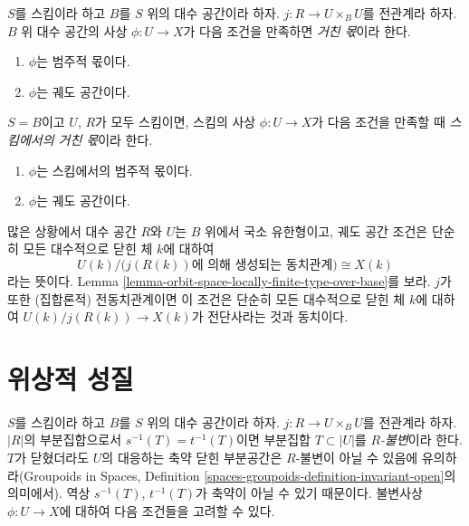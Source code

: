 \begin{definition}
\label{definition-coarse}
$S$를 스킴이라 하고 $B$를 $S$ 위의 대수 공간이라 하자.
$j : R \to U \times_B U$를 전관계라 하자.
$B$ 위 대수 공간의 사상 $\phi : U \to X$가 다음 조건을
만족하면 {\it 거친 몫}이라 한다.
\begin{enumerate}
\item $\phi$는 범주적 몫이다.
\item $\phi$는 궤도 공간이다.
\end{enumerate}
$S = B$이고 $U$, $R$가 모두 스킴이면, 스킴의 사상
$\phi : U \to X$가 다음 조건을 만족할 때
{\it 스킴에서의 거친 몫}이라 한다.
\begin{enumerate}
\item $\phi$는 스킴에서의 범주적 몫이다.
\item $\phi$는 궤도 공간이다.
\end{enumerate}
\end{definition}

\noindent
많은 상황에서 대수 공간 $R$와 $U$는 $B$ 위에서 국소 유한형이고,
궤도 공간 조건은 단순히 모든 대수적으로 닫힌 체 $k$에 대하여
$$
U(k)/\big(j(R(k))\text{에 의해 생성되는 동치관계}\big)
\cong
X(k)
$$
라는 뜻이다. Lemma
\ref{lemma-orbit-space-locally-finite-type-over-base}를 보라.
$j$가 또한 (집합론적) 전동치관계이면 이 조건은 단순히 모든
대수적으로 닫힌 체 $k$에 대하여
$U(k)/j(R(k)) \to X(k)$가 전단사라는 것과 동치이다.








\section{위상적 성질}
\label{section-topological}

\noindent
$S$를 스킴이라 하고 $B$를 $S$ 위의 대수 공간이라 하자.
$j : R \to U \times_B U$를 전관계라 하자.
$|R|$의 부분집합으로서 $s^{-1}(T) = t^{-1}(T)$이면
부분집합 $T \subset |U|$를 {\it $R$-불변}이라 한다.
$T$가 닫혔더라도 $U$의 대응하는 축약 닫힌 부분공간은
$R$-불변이 아닐 수 있음에 유의하라(Groupoids in Spaces,
Definition \ref{spaces-groupoids-definition-invariant-open}의 의미에서).
역상 $s^{-1}(T)$, $t^{-1}(T)$가 축약이 아닐 수 있기 때문이다.
불변사상 $\phi : U \to X$에 대하여 다음 조건들을 고려할 수 있다.

